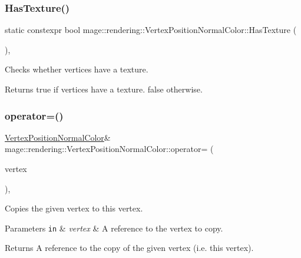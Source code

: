 \subsubsection{\texorpdfstring{Has\+Texture()}{HasTexture()}}
{\footnotesize\ttfamily static constexpr bool mage\+::rendering\+::\+Vertex\+Position\+Normal\+Color\+::\+Has\+Texture (\begin{DoxyParamCaption}{ }\end{DoxyParamCaption})\hspace{0.3cm}{\ttfamily [static]}, {\ttfamily [noexcept]}}

Checks whether vertices have a texture.

\begin{DoxyReturn}{Returns}
{\ttfamily true} if vertices have a texture. {\ttfamily false} otherwise. 
\end{DoxyReturn}
\mbox{\label{structmage_1_1rendering_1_1_vertex_position_normal_color_a3357ec7fc8baef5eb34763f38a1e6c1a}} 
\subsubsection{\texorpdfstring{operator=()}{operator=()}\hspace{0.1cm}{\footnotesize\ttfamily [1/2]}}
{\footnotesize\ttfamily \mbox{\hyperlink{structmage_1_1rendering_1_1_vertex_position_normal_color}{Vertex\+Position\+Normal\+Color}}\& mage\+::rendering\+::\+Vertex\+Position\+Normal\+Color\+::operator= (\begin{DoxyParamCaption}\item[{const \mbox{\hyperlink{structmage_1_1rendering_1_1_vertex_position_normal_color}{Vertex\+Position\+Normal\+Color}} \&}]{vertex }\end{DoxyParamCaption})\hspace{0.3cm}{\ttfamily [default]}, {\ttfamily [noexcept]}}

Copies the given vertex to this vertex.


\begin{DoxyParams}[1]{Parameters}
\mbox{\tt in}  & {\em vertex} & A reference to the vertex to copy. \\
\hline
\end{DoxyParams}
\begin{DoxyReturn}{Returns}
A reference to the copy of the given vertex (i.\+e. this vertex). 
\end{DoxyReturn}
\mbox{\label{structmage_1_1rendering_1_1_vertex_position_normal_color_a8b5c89d919ab728771ce1c6c878eb022}} 
